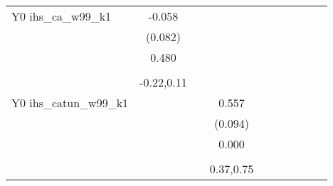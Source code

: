\begin{table}[!h]
\begin{adjustbox}{width=\columnwidth,center}
\begin{tabular}{l*{8}{c}}
Y0 ihs\_ca\_w99\_k1    &      -0.058         &                     &                     &                     &                     &                     &                     &                     &                     &                     \\
                    &     (0.082)         &                     &                     &                     &                     &                     &                     &                     &                     &                     \\
                    &       0.480         &                     &                     &                     &                     &                     &                     &                     &                     &                     \\
                    &                     &                     &                     &                     &                     &                     &                     &                     &                     &                     \\
                    &  -0.22,0.11         &                     &                     &                     &                     &                     &                     &                     &                     &                     \\
Y0 ihs\_catun\_w99\_k1 &                     &                     &       0.557\sym{***}&                     &                     &                     &                     &                     &                     &                     \\
                    &                     &                     &     (0.094)         &                     &                     &                     &                     &                     &                     &                     \\
                    &                     &                     &       0.000         &                     &                     &                     &                     &                     &                     &                     \\
                    &                     &                     &                     &                     &                     &                     &                     &                     &                     &                     \\
                    &                     &                     &   0.37,0.75         &                     &                     &                     &                     &                     &                     &                     \\

\end{tabular}
\end{adjustbox}
\end{table}
